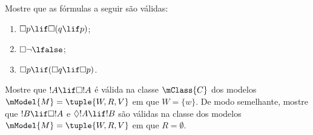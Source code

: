 \documentclass[../../../include/open-logic-section]{subfiles}
\begin{document}
\begin{prob}
  Mostre que as fórmulas a seguir são válidas:
  \begin{enumerate}
  \item $\Box p \lif \Box (q \lif p)$;
  \item $\Box \lnot \lfalse$;
  \item $\Box p \lif (\Box q \lif \Box p)$.
  \end{enumerate}
\end{prob}

\begin{prob}
  Mostre que $!A \lif \Box!A$ é válida na classe $\mClass{C}$ dos
  modelos $\mModel{M} = \tuple{W, R, V}$ em que $W = \{w\}$. De modo
  semelhante, mostre que $!B \lif \Box !A$ e $\Diamond !A \lif !B$
  são válidas na classe dos modelos $\mModel{M} = \tuple{W, R, V}$ em que
  $R = \emptyset$.
\end{prob}
\end{document}

